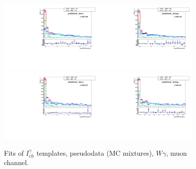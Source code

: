 \begin{figure}[htb]
\begin{center}
   \includegraphics[width=0.45\textwidth]{../figs/figs_v11/MUON_WGamma/TemplateFits/c_TEMPL_CHISO_UNblind__phoEt25to30__Barrel__RooFit_MCclosure.pdf}\includegraphics[width=0.45\textwidth]{../figs/figs_v11/MUON_WGamma/TemplateFits/c_TEMPL_CHISO_UNblind__phoEt25to30__Endcap__RooFit_MCclosure.pdf}\\
   \includegraphics[width=0.45\textwidth]{../figs/figs_v11/MUON_WGamma/TemplateFits/c_TEMPL_CHISO_UNblind__phoEt30to35__Barrel__RooFit_MCclosure.pdf}\includegraphics[width=0.45\textwidth]{../figs/figs_v11/MUON_WGamma/TemplateFits/c_TEMPL_CHISO_UNblind__phoEt30to35__Endcap__RooFit_MCclosure.pdf}\\
  \label{fig:templateFits_MCclosure_CHISO_MUON_1}
  \caption{Fits of $I_{ch}^{\gamma}$ templates, pseudodata (MC mixtures), $W\gamma$, muon channel.}
  \end{center}
\end{figure}

